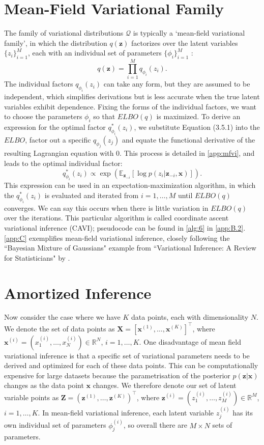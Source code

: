 \documentclass[honours,12pt]{unswthesis}
\newcommand{\R}{\mathbb{R}}
\numberwithin{equation}{section}
\theoremstyle{definition}
\begin{document}
\section{Mean-Field Variational Family}\label{sec:3.5}
The family of variational distributions $\mathcal{Q}$ is typically a `mean-field variational family', in which the distribution $q(\bm{z})$ factorizes over the latent variables $\{z_i\}^M_{i=1}$, each with an individual set of parameters $\{\phi_i\}^M_{i=1}$ \citep{blei}:
\begin{equation}
q(\bm{z})=\prod^M_{i=1}q_{\phi_i}(z_i).
\end{equation}
The individual factors $q_{\phi_i}(z_i)$ can take any form, but they are assumed to be independent, which simplifies derivations but is less accurate when the true latent variables exhibit dependence. Fixing the forms of the individual factors, we want to choose the parameters $\phi_i$ so that $ELBO(q)$ is maximized. To derive an expression for the optimal factor $q_{\phi_i}^*(z_i)$, we substitute Equation (3.5.1) into the $ELBO$, factor out a specific $q_{\phi_j}(z_j)$ and equate the functional derivative of the resulting Lagrangian equation with 0. This process is detailed in \autoref{app:mfvi}, and leads to the optimal individual factor:
\[q^*_{\phi_i}(z_i)\propto \exp\left(\mathbb{E}_{\bm{z}_{-i}}[\log p(z_i|\bm{z}_{-i},\bm{x})]\right).\]
This expression can be used in an expectation-maximization algorithm, in which the $q^*_{\phi_i}(z_i)$ is evaluated and iterated from $i=1,\dots, M$ until $ELBO(q)$ converges. We can say this occurs when there is little variation in $ELBO(q)$ over the iterations. This particular algorithm is called coordinate ascent variational inference (CAVI); pseudocode can be found in \autoref{alg:6} in \autoref{app:B.2}. \autoref{app:C} exemplifies mean-field variational inference, closely following the ``Bayesian Mixture of Gaussians" example from ``Variational Inference: A Review for Statisticians" by \citet{blei}.
\section{Amortized Inference}
Now consider the case where we have $K$ data points, each with dimensionality $N$. We denote the set of data points as $\bm{X}=\left[\bm{x}^{(1)},\dots,\bm{x}^{(K)}\right]^\top$, where $\bm{x}^{(i)}=(x^{(i)}_1,\dots,x^{(i)}_N)\in \R^N$, $i=1,\dots,K$. One disadvantage of mean field variational inference is that a specific set of variational parameters needs to be derived and optimized for each of these data points. This can be computationally expensive for large datasets because the parametrisation of the posterior $p(\bm{z}|\bm{x})$ changes as the data point $\bm{x}$ changes. We therefore denote our set of latent variable points as $\bm{Z}=(\bm{z}^{(1)},\dots,\bm{z}^{(K)})^\top$, where $\bm{z}^{(i)}=(z^{(i)}_1,\dots,z^{(i)}_M)\in \R^M$, $i=1,\dots,K$. In mean-field variational inference, each latent variable $z_j^{(i)}$ has its own individual set of parameters $\phi_j^{(i)}$, so overall there are $M\times N$ sets of parameters.
\end{document}
